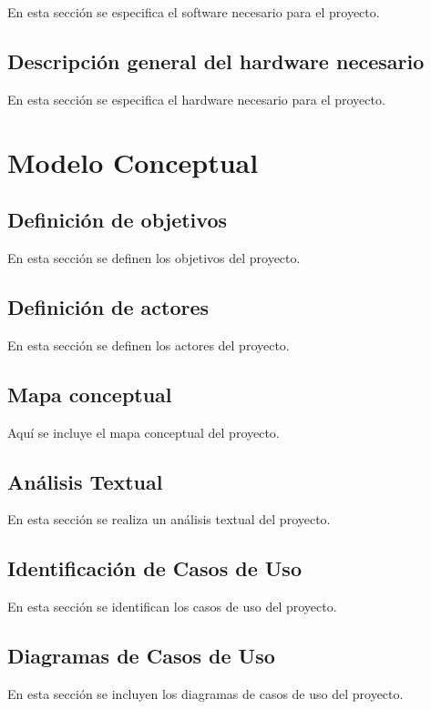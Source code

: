 En esta sección se especifica el software necesario para el proyecto.

\subsection{\textbf{Descripción general del hardware necesario}}

En esta sección se especifica el hardware necesario para el proyecto.

\section{\textbf{Modelo Conceptual}}

\subsection{\textbf{Definición de objetivos}}

En esta sección se definen los objetivos del proyecto.

\subsection{\textbf{Definición de actores}}

En esta sección se definen los actores del proyecto.

\subsection{\textbf{Mapa conceptual}}

Aquí se incluye el mapa conceptual del proyecto.

\subsection{\textbf{Análisis Textual}}

En esta sección se realiza un análisis textual del proyecto.

\subsection{\textbf{Identificación de Casos de Uso}}

En esta sección se identifican los casos de uso del proyecto.

\subsection{\textbf{Diagramas de Casos de Uso}}

En esta sección se incluyen los diagramas de casos de uso del proyecto.



